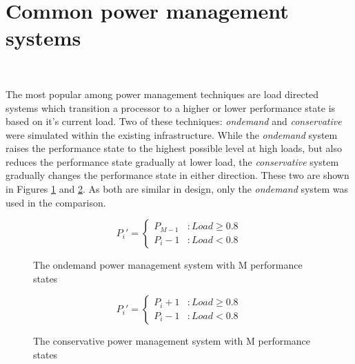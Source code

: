 \section{Common power management systems}~\label{sec:common_pow}

The most popular among power management techniques are load directed systems
which transition a processor to a higher or lower performance state is based on it's current load. Two
of these techniques: \textit{ondemand}\cite{OnDemand} and \textit{conservative} 
were simulated within the existing infrastructure. While the \textit{ondemand}
system raises the performance state to the highest possible level at high loads, but
also reduces the performance state gradually at lower load, the \textit{conservative}
system gradually changes the performance state in either direction. These two are 
shown in Figures \ref{fig:math_ondemand} and \ref{fig:math_conservative}. As both 
are similar in design, only the \textit{ondemand} system was used in the comparison.

\begin{figure}[h!]
\centering
\begin{equation*}
    P_{i}' = \left\{ \begin{array}{lr} 
                   P_{M-1} & : Load \geq 0.8 \\
		   P_{i}-1 & : Load < 0.8
                  \end{array} \right.
\end{equation*}
\caption{The ondemand power management system with M performance states}
\label{fig:math_ondemand}
\end{figure}

\begin{figure}[h!]
\centering
\begin{equation*}
    P_{i}' = \left\{ \begin{array}{lr} 
                   P_{i}+1 & : Load \geq 0.8 \\
		   P_{i}-1 & : Load < 0.8
                  \end{array} \right.
\end{equation*}
\caption{The conservative power management system with M performance states}
\label{fig:math_conservative}
\end{figure}

